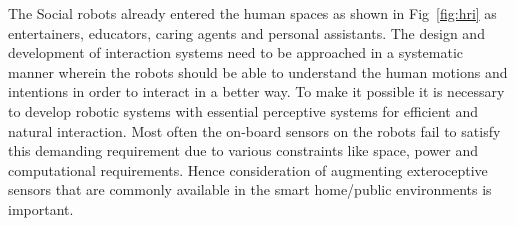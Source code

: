 \documentclass{llncs}
\begin{document}
The Social robots already entered the human spaces as shown in Fig~\ref{fig:hri} as entertainers\cite{NaoTheRobot}, educators\cite{NaoTheRobot}, caring agents\cite{ASKNao} and personal assistants\cite{ProjectRomeo}\cite{PepperTheRobot}. The design and development of interaction systems need to be approached in a systematic manner wherein the robots should be able to understand the human motions and intentions in order to interact in a better way. To make it possible it is necessary to develop robotic systems with essential perceptive systems for efficient and natural interaction. Most often the on-board sensors on the robots fail to satisfy this demanding requirement due to various constraints like space, power and computational requirements. Hence consideration of augmenting exteroceptive sensors that are commonly available in the smart home/public environments is important.
\end{document}
